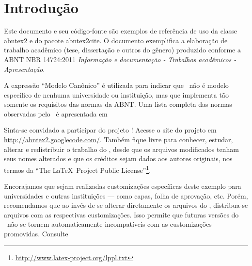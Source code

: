 \documentclass[
	12pt,				%
	openright,			%
	twoside,			%
	a4paper,			%
	english,			%
	brazil,				%
	]{abntex2}
\begin{document}

\tableofcontents*
\cleardoublepage



\textual

\chapter*[Introdução]{Introdução}

Este documento e seu código-fonte são exemplos de referência de uso da classe
\textsf{abntex2} e do pacote \textsf{abntex2cite}. O documento 
exemplifica a elaboração de trabalho acadêmico (tese, dissertação e outros do
gênero) produzido conforme a ABNT NBR 14724:2011 \emph{Informação e documentação
- Trabalhos acadêmicos - Apresentação}.

A expressão ``Modelo Canônico'' é utilizada para indicar que \abnTeX\ não é
modelo específico de nenhuma universidade ou instituição, mas que implementa tão
somente os requisitos das normas da ABNT. Uma lista completa das normas
observadas pelo \abnTeX\ é apresentada em %

Sinta-se convidado a participar do projeto \abnTeX! Acesse o site do projeto em
\url{http://abntex2.googlecode.com/}. Também fique livre para conhecer,
estudar, alterar e redistribuir o trabalho do \abnTeX, desde que os arquivos
modificados tenham seus nomes alterados e que os créditos sejam dados aos
autores originais, nos termos da ``The \LaTeX\ Project Public
License''\footnote{\url{http://www.latex-project.org/lppl.txt}}.

Encorajamos que sejam realizadas customizações específicas deste exemplo para
universidades e outras instituições --- como capas, folha de aprovação, etc.
Porém, recomendamos que ao invés de se alterar diretamente os arquivos do
\abnTeX, distribua-se arquivos com as respectivas customizações.
Isso permite que futuras versões do \abnTeX~não se tornem automaticamente
incompatíveis com as customizações promovidas. Consulte
\end{document}

